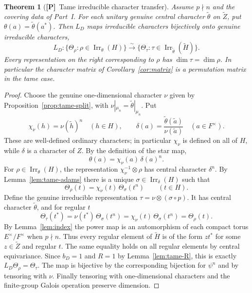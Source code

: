\documentclass[11pt]{article}
\newcommand{\Irr}{\operatorname{Irr}}
\newcommand{\tH}{\widetilde H}
\newcommand{\tZ}{\widetilde Z}
\newcommand{\Ptag}{\textnormal{\textbf{[P]}}}
\theoremstyle{plain}
\newtheorem{theorem}{Theorem}[section]
\theoremstyle{definition}
\begin{document}
\begin{theorem}[\Ptag\ Tame irreducible character transfer]\label{thm:tame-transfer}
Assume $p\nmid n$ and the covering data of Part~I.
For each unitary genuine central character $\widetilde\theta$
on $\tZ$, put $\theta(a)=\widetilde\theta(a^*)$.
Then $L_D$ maps irreducible characters bijectively onto
genuine irreducible characters,
\[
\boxed{\quad
L_D:\{\Theta_\rho:\rho\in\Irr_\theta(H)\}
\xrightarrow{\sim}
\{\Theta_\tau:\tau\in\Irr_{\widetilde\theta}(\tH)\}.
\quad}
\]
Every representation on the right corresponding to $\rho$
has $\dim\tau=\dim\rho$. In particular the character matrix
of Corollary~\ref{cor:matrix} is a permutation matrix in the
tame case.
\end{theorem}
\begin{proof}
Choose the genuine one-dimensional character $\nu$ given by
Proposition~\ref{prop:tame-split}, with
$\nu|_{\mu_n}=\widetilde\theta|_{\mu_n}$. Put
\[
\chi_\nu(h)=\nu(\widetilde h)^n\quad(h\in H),\qquad
\delta(a)=\frac{\widetilde\theta(\widetilde a)}
{\nu(\widetilde a)}\quad(a\in F^\times).
\]
These are well-defined ordinary characters; in particular
$\chi_\nu$ is defined on all of $H$, while $\delta$ is a
character of $Z$. By the definition of the star map,
\[
\theta(a)=\chi_\nu(a)\,\delta(a)^n.
\]
For $\rho\in\Irr_\theta(H)$, the representation
$\chi_\nu^{-1}\otimes\rho$ has central character $\delta^n$.
By Lemma~\ref{lem:tame-adams} there is a unique
$\sigma\in\Irr_\delta(H)$ such that
\[
\Theta_\rho(t)=\chi_\nu(t)\,\Theta_\sigma(t^n)
\qquad(t\in H).
\]
Define the genuine irreducible representation
$\tau=\nu\otimes(\sigma\circ p)$.
It has central character $\widetilde\theta$, and for regular $t$
\[
\Theta_\tau(t^*)
=\nu(t^*)\,\Theta_\sigma(t^n)
=\chi_\nu(t)\,\Theta_\sigma(t^n)
=\Theta_\rho(t).
\]
By Lemma~\ref{lem:index} the power map is an automorphism of
each compact torus $E^\times/F^\times$ when $p\nmid n$.
Thus every regular element of $\tH$ is of the form $z t^*$
for some $z\in\tZ$ and regular $t$. The same equality holds
on all regular elements by central equivariance.
Since $b_D=1$ and $R=1$ by Lemma~\ref{lem:tame-R}, this is
exactly $L_D\Theta_\rho=\Theta_\tau$.
The map is bijective by the corresponding bijection for
$\psi^n$ and by tensoring with $\nu$. Finally tensoring with
one-dimensional characters and the finite-group Galois
operation preserve dimension.
\end{proof}
\end{document}
